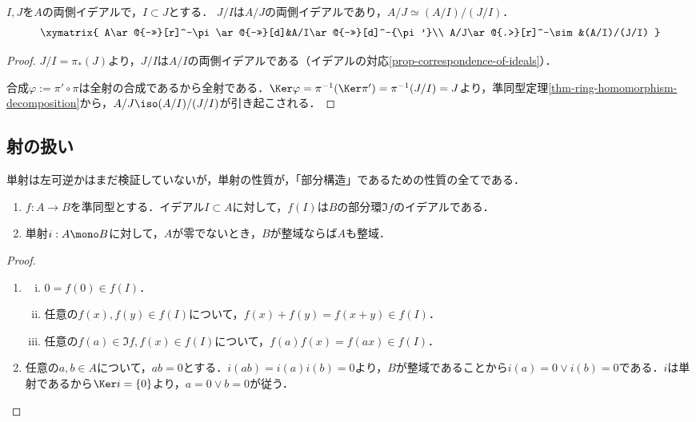 \documentclass[uplatex,dvipdfmx]{jsreport}
\begin{document}
\begin{corollary}[第三同型定理]\label{cor-iso-3}
    $I,J$を$A$の両側イデアルで，$I\subset J$とする．
    $J/I$は$A/J$の両側イデアルであり，$A/J\simeq(A/I)/(J/I)$．
    \[\xymatrix{
        A\ar@{->>}[r]^-\pi\ar@{->>}[d]&A/I\ar@{->>}[d]^-{\pi'}\\
        A/J\ar@{.>}[r]^-\sim&(A/I)/(J/I)
    }\]
\end{corollary}
\begin{proof}
    $J/I=\pi_*(J)$より，$J/I$は$A/I$の両側イデアルである（イデアルの対応\ref{prop-correspondence-of-ideals}）．
    
    合成$\varphi:=\pi'\circ\pi$は全射の合成であるから全射である．$\Ker\varphi=\pi^{-1}(\Ker\pi')=\pi^{-1}(J/I)=J$より，準同型定理\ref{thm-ring-homomorphism-decomposition}から，$A/J\iso (A/I)/(J/I)$が引き起こされる．
\end{proof}

\subsection{射の扱い}

\begin{tcolorbox}[colframe=ForestGreen, colback=ForestGreen!10!white,breakable,colbacktitle=ForestGreen!40!white,coltitle=black,fonttitle=\bfseries\sffamily,
title=]
    単射は左可逆かはまだ検証していないが，単射の性質が，「部分構造」であるための性質の全てである．
\end{tcolorbox}

\begin{proposition}\mbox{}\label{prop-mono-as-inclusion}
    \begin{enumerate}
        \item $f:A\to B$を準同型とする．イデアル$I\subset A$に対して，$f(I)$は$B$の部分環$\Im f$のイデアルである．
        \item 単射$i:A\mono B$に対して，$A$が零でないとき，$B$が整域ならば$A$も整域．
    \end{enumerate}
\end{proposition}
\begin{proof}\mbox{}
    \begin{enumerate}
        \item \begin{enumerate}[(i)]
            \item $0=f(0)\in f(I)$．
            \item 任意の$f(x),f(y)\in f(I)$について，$f(x)+f(y)=f(x+y)\in f(I)$．
            \item 任意の$f(a)\in\Im f,f(x)\in f(I)$について，$f(a)f(x)=f(ax)\in f(I)$．
        \end{enumerate}
        \item 任意の$a,b\in A$について，$ab=0$とする．$i(ab)=i(a)i(b)=0$より，$B$が整域であることから$i(a)=0\lor i(b)=0$である．$i$は単射であるから$\Ker i=\{0\}$より，$a=0\lor b=0$が従う．
    \end{enumerate}
\end{proof}
\end{document}
